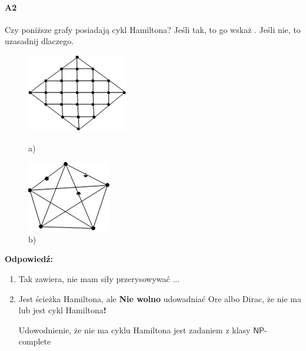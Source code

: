 \paragraph{A2}  Czy poniższe grafy posiadają  cykl Hamiltona?  Jeśli tak, to go wskaż .  Jeśli nie, to uzasadnij dlaczego.
\begin{figure}[H]
\centering
\begin{minipage}{.5\textwidth}
\centering
\includegraphics[width=.5\linewidth]{img/g2}
\caption*{a)}
\end{minipage}%
\begin{minipage}{.5\textwidth}
\centering
\includegraphics[width=.5\linewidth]{img/g3}
\caption*{b)}
\end{minipage}
\end{figure}

\textbf{Odpowiedź:}
\begin{enumerate}[label=\alph*)]
\item Tak zawiera, nie mam siły przerysowywać ...
\item Jest ścieżka Hamiltona, ale \textbf{Nie wolno} udowadniać Ore albo Dirac, że nie ma lub jest cykl Hamiltona\textbf{!}

Udowodnienie, że nie ma cyklu Hamiltona jest zadaniem z klasy $\mathsf{NP}$- complete
\end{enumerate}


